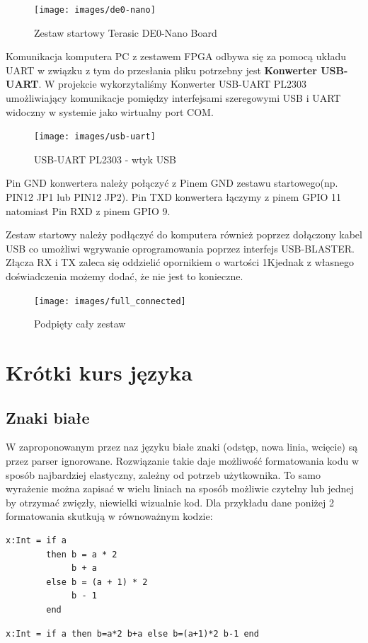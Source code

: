 \begin{figure}[h]
\begin{center}
\texttt{[image: images/de0-nano]}
\caption{Zestaw startowy Terasic DE0-Nano Board}
\end{center}
\end{figure}

Komunikacja komputera PC z zestawem FPGA odbywa się za pomocą układu UART w związku z tym do przesłania pliku potrzebny jest \textbf{Konwerter USB-UART}. W projekcie wykorzytaliśmy Konwerter USB-UART PL2303 umożliwiający komunikacje pomiędzy interfejsami szeregowymi USB i UART widoczny w systemie jako wirtualny port COM.
\begin{figure}
\centering
\texttt{[image: images/usb-uart]}
\caption{USB-UART PL2303 - wtyk USB}
\end{figure}
Pin GND konwertera należy połączyć z Pinem GND zestawu startowego(np. PIN12 JP1 lub PIN12 JP2). Pin TXD konwertera łączymy z pinem GPIO 11 natomiast Pin RXD z pinem GPIO 9.

Zestaw startowy należy podłączyć do komputera również poprzez dołączony kabel USB co umożliwi wgrywanie oprogramowania poprzez interfejs USB-BLASTER. Złącza RX i TX zaleca się oddzielić opornikiem o wartości 1K\ohm\space jednak z własnego doświadczenia możemy dodać, że nie jest to konieczne.
\begin{figure}
\centering
\texttt{[image: images/full\_connected]}
\caption{Podpięty cały zestaw}
\end{figure}
\section{Krótki kurs języka}
\subsection{Znaki białe}
W zaproponowanym przez naz języku białe znaki (odstęp, nowa linia, wcięcie) są przez parser ignorowane.
Rozwiązanie takie daje możliwość formatowania kodu w sposób najbardziej elastyczny, zależny od potrzeb użytkownika. To samo wyrażenie można zapisać w wielu liniach na sposób możliwie czytelny lub jednej by otrzymać zwięzły, niewielki wizualnie kod.
Dla przykładu dane poniżej 2 formatowania skutkują w równoważnym kodzie:
\begin{lstlisting}[frame=single]
x:Int = if a
        then b = a * 2
             b + a
        else b = (a + 1) * 2
             b - 1
        end
\end{lstlisting}
\begin{lstlisting}[frame=single]
x:Int = if a then b=a*2 b+a else b=(a+1)*2 b-1 end
\end{lstlisting}


